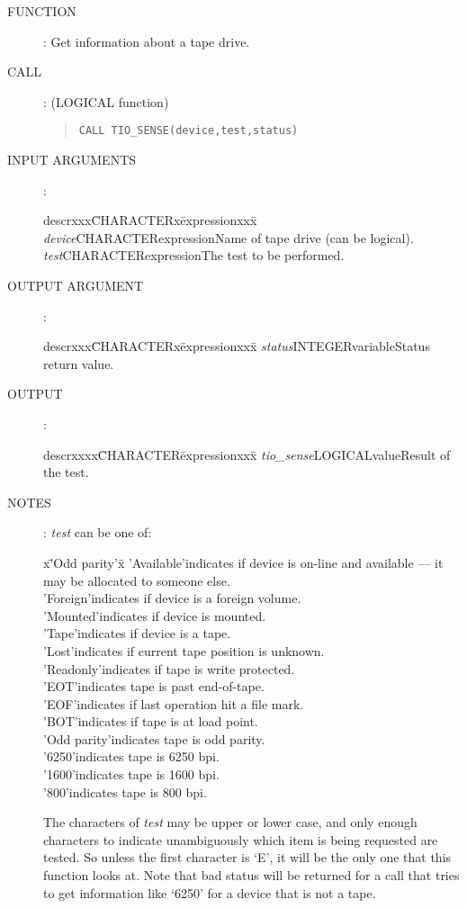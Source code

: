 \begin{description}
\item [FUNCTION]:
Get information about a tape drive.
\item [CALL]: (LOGICAL function)
\begin{quote}
{\tt CALL TIO\_SENSE(device,test,status)}
\end{quote}
\item [INPUT ARGUMENTS]:
\begin{tabbing}
descrxxx\=CHARACTERx\=expressionxxx\=\kill
{\em device}\>CHARACTER\>expression\>Name of tape drive (can be logical).\\
{\em test}\>CHARACTER\>expression\>The test to be performed.
\end{tabbing}
\item [OUTPUT ARGUMENT]:
\begin{tabbing}
descrxxx\=CHARACTERx\=expressionxxx\=\kill
{\em status}\>INTEGER\>variable\>Status return value.
\end{tabbing}
\item [OUTPUT]:
\begin{tabbing}
descrxxxx\=CHARACTER\=expressionxxx\=\kill
{\em tio\_sense}\>LOGICAL\>value\>Result of the test.
\end{tabbing}
\item [NOTES]:
{\em test} can be one of:
\begin{tabbing}
x\='Odd parity'x\=\kill
\>'Available'\>indicates if device is on-line and available --- it may be
allocated to someone else.\\
\>'Foreign'\>indicates if device is a foreign volume.\\
\>'Mounted'\>indicates if device is mounted.\\
\>'Tape'\>indicates if device is a tape.\\
\>'Lost'\>indicates if current tape position is unknown.\\
\>'Readonly'\>indicates if tape is write protected.\\
\>'EOT'\>indicates tape is past end-of-tape.\\
\>'EOF'\>indicates if last operation hit a file mark.\\
\>'BOT'\>indicates if tape is at load point.\\
\>'Odd parity'\>indicates tape is odd parity.\\
\>'6250'\>indicates tape is 6250 bpi.\\
\>'1600'\>indicates tape is 1600 bpi.\\
\>'800'\>indicates tape is 800 bpi.
\end{tabbing}
The characters of {\em test} may be upper or lower case, and only enough
characters to indicate unambiguously which item is being requested are tested.
So unless the first character is `E', it will be the only one that this
function looks at.
Note that bad status will be returned for a call that tries to get information
like `6250' for a device that is not a tape.
\end{description}
